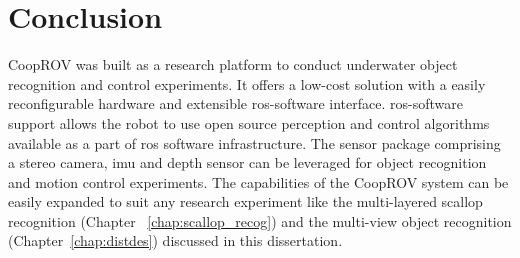 \section{Conclusion}

CoopROV was built as a research platform to conduct underwater object recognition and control experiments. It offers a low-cost solution with a easily reconfigurable hardware and extensible \gls{ros}-software interface. \gls{ros}-software support allows the robot to use open source perception and control algorithms available as a part of \gls{ros} software infrastructure. The sensor package comprising a stereo camera, \gls{imu} and depth sensor can be leveraged for object recognition and motion control experiments. The capabilities of the CoopROV system can be easily expanded to suit any research experiment like the multi-layered scallop recognition (Chapter ~\ref{chap:scallop_recog}) and the multi-view object recognition (Chapter~\ref{chap:distdes}) discussed in this dissertation.
